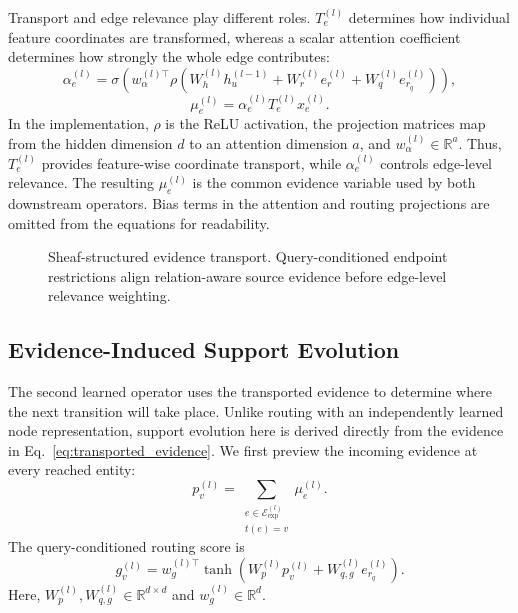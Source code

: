 \documentclass[a4paper,fleqn]{cas-sc}
\begin{document}
Transport and edge relevance play different roles. $T_e^{(l)}$ determines how
individual feature coordinates are transformed, whereas a scalar attention
coefficient determines how strongly the whole edge contributes:
\begin{equation}
\alpha_e^{(l)}
=
\sigma\!\left(
w_{\alpha}^{(l)\top}
\rho\!\left(
W_h^{(l)}h_u^{(l-1)}
+W_r^{(l)}e_r^{(l)}
+W_q^{(l)}e_{r_q}^{(l)}
\right)
\right),
\end{equation}
\begin{equation}
\mu_e^{(l)}
=
\alpha_e^{(l)}T_e^{(l)}x_e^{(l)}.
\label{eq:transported_evidence}
\end{equation}
In the implementation, $\rho$ is the ReLU activation, the projection matrices
map from the hidden dimension $d$ to an attention dimension $a$, and
$w_{\alpha}^{(l)}\in\mathbb{R}^{a}$. Thus, $T_e^{(l)}$ provides feature-wise
coordinate transport, while $\alpha_e^{(l)}$ controls edge-level relevance.
The resulting $\mu_e^{(l)}$ is the common evidence variable used by both
downstream operators. Bias terms in the attention and routing projections are
omitted from the equations for readability.

\begin{figure}[pos=htbp]
\centering
{}
\caption{Sheaf-structured evidence transport. Query-conditioned endpoint
restrictions align relation-aware source evidence before edge-level relevance
weighting.}
\label{fig:sheaf_transport}
\end{figure}
\FloatBarrier

\subsection{Evidence-Induced Support Evolution}\label{subsec:topk_module}

The second learned operator uses the transported evidence to determine where the
next transition will take place. Unlike routing with an independently learned
node representation, support evolution here is derived directly from the
evidence in Eq.~\eqref{eq:transported_evidence}. We first preview the incoming
evidence at every reached entity:
\begin{equation}
p_v^{(l)}
=
\sum_{\substack{e\in\mathcal{E}_{\mathrm{exp}}^{(l)}\\t(e)=v}}
\mu_e^{(l)}.
\end{equation}
The query-conditioned routing score is
\begin{equation}
g_v^{(l)}
=
w_g^{(l)\top}
\tanh\!\left(W_p^{(l)}p_v^{(l)}+W_{q,g}^{(l)}e_{r_q}^{(l)}\right).
\end{equation}
Here, $W_p^{(l)},W_{q,g}^{(l)}\in\mathbb{R}^{d\times d}$ and
$w_g^{(l)}\in\mathbb{R}^{d}$.
\end{document}
